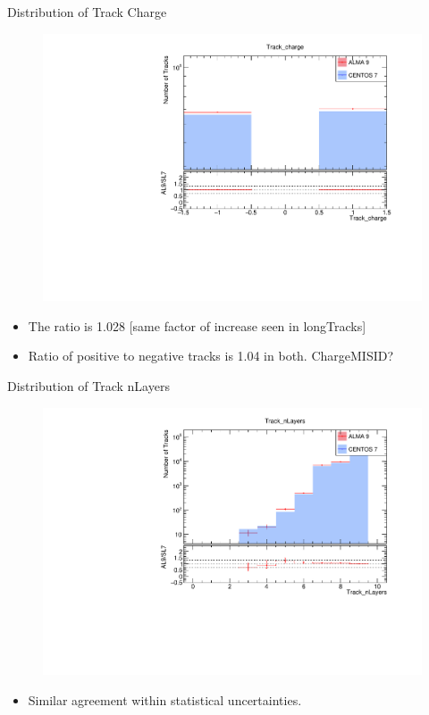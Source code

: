 \begin{frame}{Distribution of Track Charge}
    \vspace{-0.3cm}
    \begin{figure}
        \includegraphics[width=0.9\linewidth]{./output/Track_charge.pdf}
    \end{figure}
    \vspace{-0.6cm}
        \begin{itemize}
            \small
            \item The ratio is 1.028 [same factor of increase seen in longTracks]
            \item Ratio of positive to negative tracks is 1.04 in both. ChargeMISID?
        \end{itemize}
\end{frame}

\begin{frame}{Distribution of Track nLayers}
    \vspace{-0.3cm}
    \begin{figure}
        \includegraphics[width=0.95\linewidth]{./output/Track_nLayers.pdf}
    \end{figure}
    \vspace{-0.6cm}
    \begin{itemize}
        \item Similar agreement within statistical uncertainties.
    \end{itemize}
\end{frame}


